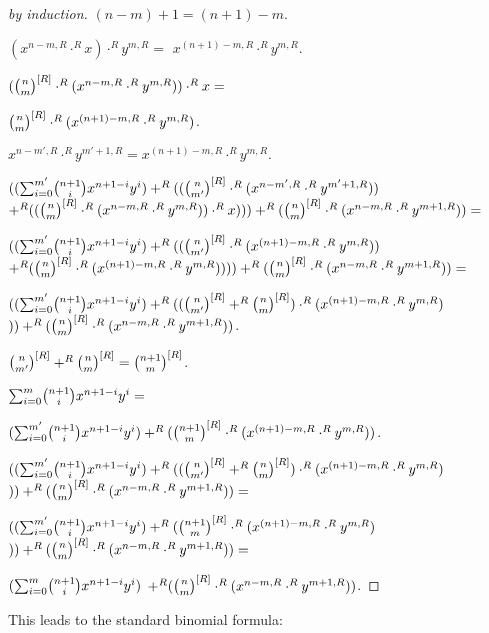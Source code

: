 \documentclass[11pt]{article}
\begin{document}
\begin{forthel}
\begin{proof}[by induction]
$(n - m) + 1 = (n + 1) - m$.

$(x^{n - m,R} \cdot^{R} x) \cdot^{R} y^{m,R} =$
$x^{(n+1)-m,R} \cdot^{R} y^{m,R}$.

$(\cho{n}{m}^{[R]} \cdot^{R} (x^{n - m,R} \cdot^{R} y^{m,R})) \cdot^{R} x = $

$\cho{n}{m}^{[R]} \cdot^{R} (x^{(n+1) - m,R} \cdot^{R} y^{m,R})$.

$x^{n-m',R} \cdot^{R} y^{m'+1,R} = x^{(n+1)-m,R} \cdot^{R} y^{m,R}.$

$ ((\binsum{m'}{n+1}{x}{y}{R}) +^{R} ((\cho{n}{m'}^{[R]} \cdot^{R} (x^{n-m',R} \cdot^{R} y^{m'+1,R})) $
$ +^{R} 
((\cho{n}{m}^{[R]} \cdot^{R} (x^{n - m,R} \cdot^{R} y^{m,R})) \cdot^{R} x)))
   +^{R} (\cho{n}{m}^{[R]} \cdot^{R} (x^{n - m,R} \cdot^{R} y^{m+1,R})) = $

$ ((\binsum{m'}{n+1}{x}{y}{R}) +^{R} ((\cho{n}{m'}^{[R]} \cdot^{R} (x^{(n+1)-m,R} \cdot^{R} y^{m,R})) $
$ +^{R} 
(\cho{n}{m}^{[R]} \cdot^{R} (x^{(n+1) - m,R} \cdot^{R} y^{m,R}))))
   +^{R} (\cho{n}{m}^{[R]} \cdot^{R} (x^{n - m,R} \cdot^{R} y^{m+1,R})) =$

$ ((\binsum{m'}{n+1}{x}{y}{R}) +^{R} ((\cho{n}{m'}^{[R]} +^{R}  \cho{n}{m}^{[R]} )\cdot^{R} (x^{(n+1)-m,R} \cdot^{R} y^{m,R}) $
$  ))
   +^{R} (\cho{n}{m}^{[R]} \cdot^{R} (x^{n - m,R} \cdot^{R} y^{m+1,R})) $.

$\cho{n}{m'}^{[R]} +^{R}  \cho{n}{m}^{[R]} = \cho{n+1}{m}^{[R]}$.



$ \binsum{m}{n+1}{x}{y}{R} =$

$(\binsum{m'}{n+1}{x}{y}{R}) +^{R} (\cho{n+1}{m}^{[R]} \cdot^{R} (x^{(n+1)-m,R} \cdot^{R} y^{m,R}))$.



$ ((\binsum{m'}{n+1}{x}{y}{R}) +^{R} ((\cho{n}{m'}^{[R]} +^{R}  \cho{n}{m}^{[R]} )\cdot^{R} (x^{(n+1)-m,R} \cdot^{R} y^{m,R}) $
$  ))
   +^{R} (\cho{n}{m}^{[R]} \cdot^{R} (x^{n - m,R} \cdot^{R} y^{m+1,R})) =$


$ ((\binsum{m'}{n+1}{x}{y}{R}) +^{R} (\cho{n+1}{m}^{[R]} \cdot^{R} (x^{(n+1)-m,R} \cdot^{R} y^{m,R}) $
$  ))
   +^{R} (\cho{n}{m}^{[R]} \cdot^{R} (x^{n - m,R} \cdot^{R} y^{m+1,R})) =$

$ (\binsum{m}{n+1}{x}{y}{R}) $
$  +^{R} (\cho{n}{m}^{[R]} \cdot^{R} (x^{n - m,R} \cdot^{R} y^{m+1,R})) $.

\end{proof}
\end{forthel}
%
This leads to the standard binomial formula:
%
\end{document}
